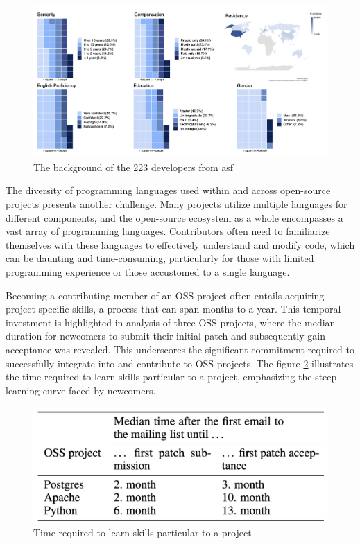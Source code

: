 \begin{figure}[ht]
    \centering
    \includegraphics[width=1\linewidth]{figs/contributor_background.png}
    \caption{The background of the 223 developers from \ac{asf} \citep{04guizani2021long}}
    \label{fig:contributor_background}
\end{figure}

The diversity of programming languages used within and across open-source projects presents another challenge. Many projects utilize multiple languages for different components, and the open-source ecosystem as a whole encompasses a vast array of programming languages. Contributors often need to familiarize themselves with these languages to effectively understand and modify code, which can be daunting and time-consuming, particularly for those with limited programming experience or those accustomed to a single language.


Becoming a contributing member of an OSS project often entails acquiring project-specific skills, a process that can span months to a year. This temporal investment is highlighted in \citet{bird2007open} analysis of three OSS projects, where the median duration for newcomers to submit their initial patch and subsequently gain acceptance was revealed. This underscores the significant commitment required to successfully integrate into and contribute to OSS projects. The figure \ref{fig:timeskill} illustrates the time required to learn skills particular to a project, emphasizing the steep learning curve faced by newcomers.

\begin{figure}[ht]
    \centering
    \includegraphics[width=0.65\linewidth]{figs/timeskill.png}
    \caption{Time required to learn skills particular to a project \citep{bird2007open}}
    \label{fig:timeskill}
\end{figure}


